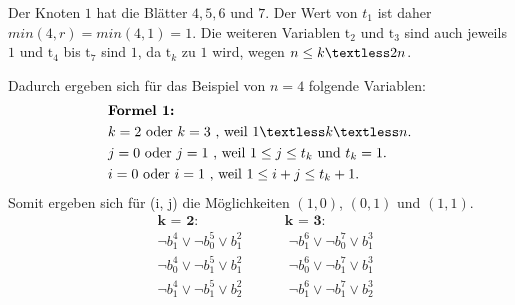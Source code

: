 \documentclass[a4,abstract=on]{scrartcl}
\begin{document}
Der Knoten $1$ hat die Blätter $4,5,6$ und $7$. Der Wert von $t_1$ ist daher $min(4,r) = min(4,1) = 1$. Die weiteren Variablen $\text{t}_2$ und $\text{t}_3$ sind auch jeweils $1$ und $\text{t}_4$ bis $\text{t}_7$ sind $1$, da $\text{t}_k$ zu $1$ wird, wegen $n \leq k \textless 2n$.

Dadurch ergeben sich für das Beispiel von $n=4$ folgende Variablen:\\
\begin{align*}
&\textbf{Formel 1:}\\
&k=2 \text{ oder } k=3 \text{ , weil } 1 \textless k \textless n.\\
&j=0 \text{ oder } j=1 \text{ , weil } 1 \leq j \leq t_k \text{ und } t_k = 1.\\
&i=0 \text{ oder } i=1 \text{ , weil } 1\leq i+j \leq t_{k}+1.\\
\end{align*}
Somit ergeben sich für (i, j) die Möglichkeiten $(1,0)$, $(0,1)$ und $(1,1)$.\\
\begin{align*}
&\textbf{k = 2:} {~~~~~~~~~~~~~~~~~~~~~~~~~~~~} \textbf{k = 3:}\\
&\neg b_1^4 \vee \neg b_0^5 \vee b_1^2 {~~~~~~~~~~~~~~~} \neg b_1^6 \vee \neg b_0^7 \vee b_1^3\\
&\neg b_0^4 \vee \neg b_1^5 \vee b_1^2 {~~~~~~~~~~~~~~~} \neg b_0^6 \vee \neg b_1^7 \vee b_1^3\\
&\neg b_1^4 \vee \neg b_1^5 \vee b_2^2 {~~~~~~~~~~~~~~~} \neg b_1^6 \vee \neg b_1^7 \vee b_2^3\\
\end{align*}
\end{document}
